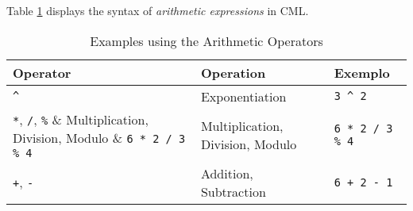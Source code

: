 Table \ref{tab:arithmetic-examples} displays the syntax of \emph{arithmetic expressions}
in CML.

\begin{table}[H]
\centering
\begin{tabular}
{ l l l }
\hline
Operator & Operation & Exemplo \\
\hline
\verb!^! & Exponentiation & \verb!3 ^ 2! \\
\verb!*!, \verb!/!, \verb!%! & Multiplication, Division, Modulo & \verb!6 * 2 / 3 % 4!  \\
\verb!+!, \verb!-! & Addition, Subtraction & \verb!6 + 2 - 1! \\
\end{tabular}
\caption{Examples using the Arithmetic Operators}
\label{tab:arithmetic-examples}
\end{table}
